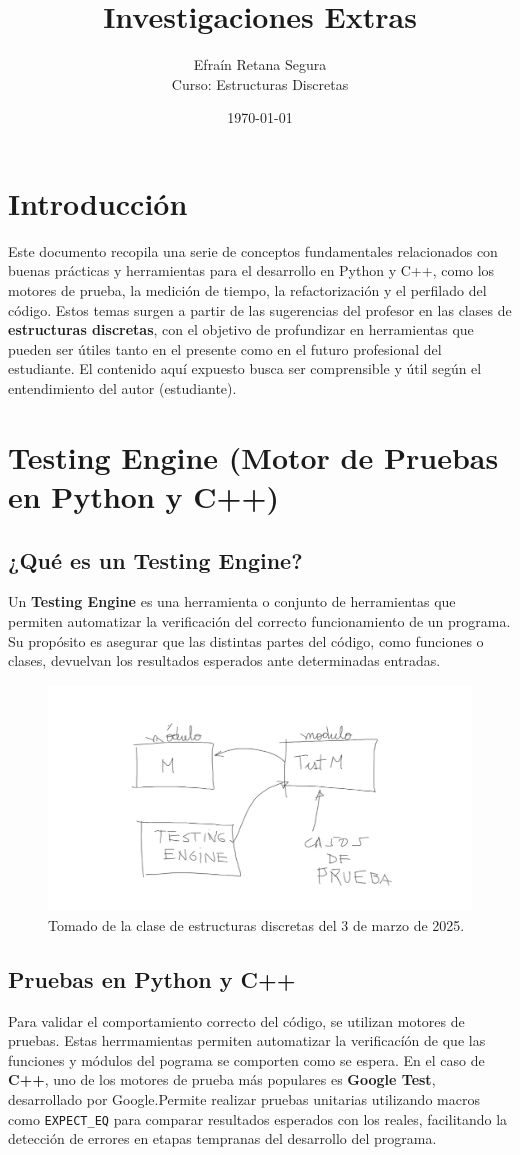 \documentclass[12pt]{article}
\title{Investigaciones Extras}
\author{Efraín Retana Segura \\ Curso: Estructuras Discretas}
\date{\today}
\begin{document}
\maketitle

\section*{Introducción}
Este documento recopila una serie de conceptos fundamentales relacionados con buenas prácticas y herramientas para el desarrollo en Python y C++, como los motores de prueba, la medición de tiempo, la refactorización y el perfilado del código. Estos temas surgen a partir de las sugerencias del profesor en las clases de \textbf{estructuras discretas}, con el objetivo de profundizar en herramientas que pueden ser útiles tanto en el presente como en el futuro profesional del estudiante. El contenido aquí expuesto busca ser comprensible y útil según el entendimiento del autor (estudiante).

\section{Testing Engine (Motor de Pruebas en Python y C++)}

\subsection*{¿Qué es un Testing Engine?}
Un \textbf{Testing Engine} es una herramienta o conjunto de herramientas que permiten automatizar la verificación del correcto funcionamiento de un programa. Su propósito es asegurar que las distintas partes del código, como funciones o clases, devuelvan los resultados esperados ante determinadas entradas.

\begin{figure}[H]
    \centering
    \includegraphics[width=0.5\linewidth]{Imagenes/Capture.PNG}
    \caption{Tomado de la clase de estructuras discretas del 3 de marzo de 2025.}
    \label{fig:testing-engine}
\end{figure}

\subsection*{Pruebas en Python y C++}
Para validar el comportamiento correcto del código, se utilizan motores de pruebas. Estas herrmamientas permiten automatizar la verificacíón de que las funciones y módulos del pograma se comporten como se espera. En el caso de \textbf{C++}, uno de los motores de prueba más populares es \textbf{Google Test}, desarrollado por Google.Permite realizar pruebas unitarias utilizando macros como \texttt{EXPECT\_EQ} para comparar resultados esperados con los reales, facilitando la detección de errores en etapas tempranas del desarrollo del programa. \\
\end{document}

